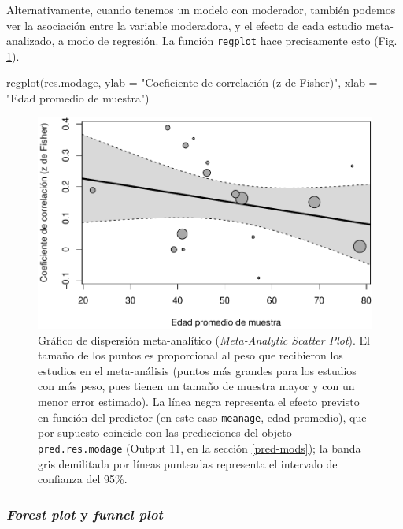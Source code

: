 \documentclass[
  bookmarksnumbered]{article}
\newenvironment{Shaded}{\begin{snugshade}}{\end{snugshade}}
\newcommand{\AttributeTok}[1]{\textcolor[rgb]{0.00,0.34,0.68}{#1}}
\newcommand{\FunctionTok}[1]{\textcolor[rgb]{0.39,0.29,0.61}{#1}}
\newcommand{\NormalTok}[1]{\textcolor[rgb]{0.12,0.11,0.11}{#1}}
\newcommand{\StringTok}[1]{\textcolor[rgb]{0.75,0.01,0.01}{#1}}
\begin{document}
Alternativamente, cuando tenemos un modelo con moderador, también podemos ver la asociación entre la variable moderadora, y el efecto de cada estudio meta-analizado, a modo de regresión. La función \texttt{regplot} hace precisamente esto (Fig. \ref{fig:reg-plot1}).

\begin{Shaded}
\begin{Highlighting}[]
\FunctionTok{regplot}\NormalTok{(res.modage,}
        \AttributeTok{ylab =} \StringTok{"Coeficiente de correlación (z de Fisher)"}\NormalTok{,}
        \AttributeTok{xlab =} \StringTok{"Edad promedio de muestra"}\NormalTok{)}
\end{Highlighting}
\end{Shaded}

\begin{figure}
\centering
\includegraphics{Meta-analysis_files/figure-latex/reg-plot1-1.pdf}
\caption{\label{fig:reg-plot1}Gráfico de dispersión meta-analítico (\emph{Meta-Analytic Scatter Plot}). El tamaño de los puntos es proporcional al peso que recibieron los estudios en el meta-análisis (puntos más grandes para los estudios con más peso, pues tienen un tamaño de muestra mayor y con un menor error estimado). La línea negra representa el efecto previsto en función del predictor (en este caso \texttt{meanage}, edad promedio), que por supuesto coincide con las predicciones del objeto \texttt{pred.res.modage} (Output 11, en la sección \ref{pred-mods}); la banda gris demilitada por líneas punteadas representa el intervalo de confianza del 95\%.}
\end{figure}

\hypertarget{plot-mod}{%
\subsubsection{\texorpdfstring{\emph{Forest plot} y \emph{funnel plot}}{Forest plot y funnel plot}}\label{plot-mod}}
\end{document}

